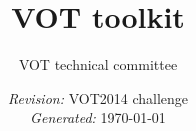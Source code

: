 
\title{VOT toolkit}
\author{VOT technical committee}
\date{\emph{Revision:} VOT2014 challenge \\
\emph{Generated:} {\today}}

\maketitle

